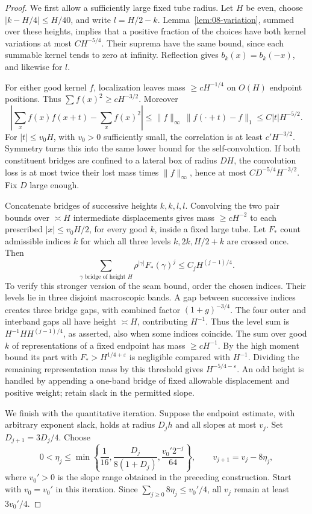 \begin{proof}
We first allow a sufficiently large fixed tube radius. Let \(H\) be even,
choose \(|k-H/4|\le H/40\), and write \(l=H/2-k\).
Lemma~\ref{lem:08-variation}, summed over these heights, implies that a
positive fraction of the choices have both kernel variations at most
\(C H^{-5/4}\). Their suprema have the same bound, since each summable
kernel tends to zero at infinity. Reflection gives \(b_k(x)=b_k(-x)\),
and likewise for \(l\).

For either good kernel \(f\), localization leaves mass \(\ge cH^{-1/4}\)
on \(O(H)\) endpoint positions. Thus
\(\sum f(x)^2\ge cH^{-3/2}\). Moreover
\[
 \left|\sum_x f(x)f(x+t)-\sum_x f(x)^2\right|
 \le \|f\|_\infty\,\|f(\cdot+t)-f\|_1
 \le C|t|H^{-5/2}.
\]
For \(|t|\le v_0H\), with \(v_0>0\) sufficiently small, the
correlation is at least \(c'H^{-3/2}\). Symmetry turns this into the same
lower bound for the self-convolution. If both constituent bridges are
confined to a lateral box of radius \(DH\), the convolution loss is at
most twice their lost mass times \(\|f\|_\infty\), hence at most
\(CD^{-5/4}H^{-3/2}\). Fix \(D\) large enough.

Concatenate bridges of successive heights \(k,k,l,l\). Convolving the
two pair bounds over \(\asymp H\) intermediate displacements gives mass
\(\ge cH^{-2}\) to each prescribed \(|x|\le v_0H/2\), for every good
\(k\), inside a fixed large tube. Let \(F_*\) count admissible indices
\(k\) for which all three levels \(k,2k,H/2+k\) are crossed once.
Then
\[
 \sum_{\gamma\text{ bridge of height }H}
       \rho^{|\gamma|}F_*(\gamma)^j
       \le C_j H^{(j-1)/4}.
\]
To verify this stronger version of the seam bound, order the chosen
indices. Their levels lie in three disjoint macroscopic bands. A gap
between successive indices creates three bridge gaps, with combined
factor \((1+g)^{-3/4}\). The four outer and interband gaps all have
height \(\asymp H\), contributing \(H^{-1}\). Thus the level sum is
\(H^{-1}H H^{(j-1)/4}\), as asserted, also when some indices coincide.
The sum over good \(k\) of representations of a fixed endpoint has mass
\(\ge cH^{-1}\). By the high moment bound its part with
\(F_*>H^{1/4+\varepsilon}\) is negligible compared with \(H^{-1}\).
Dividing the remaining representation mass by this threshold gives
\(H^{-5/4-\varepsilon}\). An odd height is handled by appending a
one-band bridge of fixed allowable displacement and positive weight;
retain slack in the permitted slope.

We finish with the quantitative iteration. Suppose the endpoint estimate, with arbitrary exponent slack, holds at radius $D_jh$ and all slopes at most $v_j$. Set $D_{j+1}=3D_j/4$. Choose
\[
 0<\eta_j\le\min\left\{\frac1{16},\frac{D_j}{8(1+D_j)},
                         \frac{v_0'2^{-j}}{64}\right\},
 \qquad v_{j+1}=v_j-8\eta_j,
\]
where $v_0'>0$ is the slope range obtained in the preceding construction. Start with $v_0=v_0'$ in this iteration. Since $\sum_{j\ge0}8\eta_j\le v_0'/4$, all $v_j$ remain at least $3v_0'/4$.


\end{proof}
